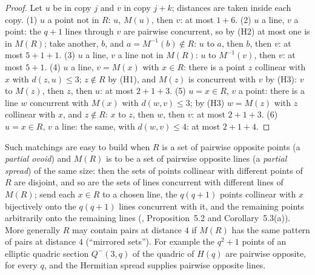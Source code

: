 \documentclass[11pt]{amsart}
\theoremstyle{definition}
\theoremstyle{remark}
\begin{document}
\begin{proof}
Let $u$ be in copy $j$ and $v$ in copy $j+k$; distances are taken inside each copy.
(1) $u$ a point not in $R$: $u$, $M(u)$, then $v$: at most $1+6$.
(2) $u$ a line, $v$ a point: the $q+1$ lines through $v$ are pairwise concurrent, so by (H2) at most one is in $M(R)$; take another, $b$, and $a=M^{-1}(b)\notin R$: $u$ to $a$, then $b$, then $v$: at most $5+1+1$.
(3) $u$ a line, $v$ a line not in $M(R)$: $u$ to $M^{-1}(v)$, then $v$: at most $5+1$.
(4) $u$ a line, $v=M(x)$ with $x\in R$: there is a point $z$ collinear with $x$ with $d(z,u)\le 3$; $z\notin R$ by (H1), and $M(z)$ is concurrent with $v$ by (H3): $v$ to $M(z)$, then $z$, then $u$: at most $2+1+3$.
(5) $u=x\in R$, $v$ a point: there is a line $w$ concurrent with $M(x)$ with $d(w,v)\le3$; by (H3) $w=M(z)$ with $z$ collinear with $x$, and $z\notin R$: $x$ to $z$, then $w$, then $v$: at most $2+1+3$.
(6) $u=x\in R$, $v$ a line: the same, with $d(w,v)\le 4$: at most $2+1+4$.
\end{proof}

Such matchings are easy to build when $R$ is a set of pairwise opposite points (a \emph{partial ovoid}) and $M(R)$ is to be a set of pairwise opposite lines (a \emph{partial spread}) of the same size: then the sets of points collinear with different points of $R$ are disjoint, and so are the sets of lines concurrent with different lines of $M(R)$; send each $x\in R$ to a chosen line, the $q(q+1)$ points collinear with $x$ bijectively onto the $q(q+1)$ lines concurrent with it, and the remaining points arbitrarily onto the remaining lines (, Proposition~5.2 and Corollary~5.3(a)). More generally $R$ may contain pairs at distance $4$ if $M(R)$ has the same pattern of pairs at distance $4$ (``mirrored sets''). For example the $q^2+1$ points of an elliptic quadric section $Q^-(3,q)$ of the quadric of $H(q)$ are pairwise opposite, for every $q$, and the Hermitian spread supplies pairwise opposite lines.
\end{document}
